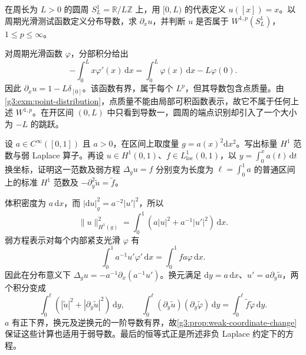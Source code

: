 \BookExercises

\begin{exercise}\label{g3:ex:circle-sawtooth-weak}
	在周长为 \(L>0\) 的圆周 \(S^1_L=\mathbb R/L\mathbb Z\) 上，用 \([0,L)\) 的代表定义 \(u([x])=x\)。以周期光滑测试函数定义分布导数，求 \(\partial_xu\)，并判断 \(u\) 是否属于 \(W^{1,p}(S^1_L)\)，\(1\le p\le\infty\)。
\end{exercise}
\begin{solution}
	对周期光滑函数 \(\varphi\)，分部积分给出
	\[
		-\int_0^L x\varphi'(x)\,\mathrm dx
		=\int_0^L\varphi(x)\,\mathrm dx-L\varphi(0).
	\]
	因此 \(\partial_xu=1-L\delta_{[0]}\)。该函数有界，属于每个 \(L^p\)，但其导数包含点质量。由\cref{g3:exm:point-distribution}，点质量不能由局部可积函数表示，故它不属于任何上述 \(W^{1,p}\)。在开区间 \((0,L)\) 中只看到导数一，圆周的端点识别却引入了一个大小为 \(-L\) 的跳跃。
\end{solution}

\begin{exercise}\label{g3:ex:weighted-interval-weak-laplacian}
	设 \(a\in C^\infty([0,1])\) 且 \(a>0\)，在区间上取度量 \(g=a(x)^2\mathrm dx^2\)。写出标量 \(H^1\) 范数与弱 Laplace 算子。再设 \(u\in H^1(0,1)\)、\(f\in L^1_{\mathrm{loc}}(0,1)\)，以 \(y=\int_0^x a(t)\,\mathrm dt\) 换坐标，证明这一范数及弱方程 \(\Delta_gu=f\) 分别变为长度为 \(\ell=\int_0^1a\) 的普通区间上的标准 \(H^1\) 范数及 \(-\partial_y^2\widetilde u=\widetilde f\)。
\end{exercise}
\begin{solution}
	体积密度为 \(a\,\mathrm dx\)，而 \(|\mathrm du|_g^2=a^{-2}|u'|^2\)，所以
	\[
		\|u\|_{H^1(g)}^2=\int_0^1\left(a|u|^2+a^{-1}|u'|^2\right)\,\mathrm dx.
	\]
	弱方程表示对每个内部紧支光滑 \(\varphi\) 有
	\[
		\int_0^1a^{-1}u'\varphi'\,\mathrm dx=\int_0^1fa\varphi\,\mathrm dx.
	\]
	因此在分布意义下 \(\Delta_gu=-a^{-1}\partial_x(a^{-1}u')\)。换元满足 \(\mathrm dy=a\,\mathrm dx\)、\(u'=a\partial_y\widetilde u\)，两个积分变成
	\[
		\int_0^\ell\left(|\widetilde u|^2+|\partial_y\widetilde u|^2\right)\,\mathrm dy,
		\qquad
		\int_0^\ell(\partial_y\widetilde u)(\partial_y\widetilde\varphi)\,\mathrm dy
		=\int_0^\ell\widetilde f\widetilde\varphi\,\mathrm dy.
	\]
	\(a\) 有正下界，换元及逆换元的一阶导数有界，故\cref{g3:prop:weak-coordinate-change}保证这些计算也适用于弱导数。最后的恒等式正是所述非负 Laplace 约定下的方程。
\end{solution}

